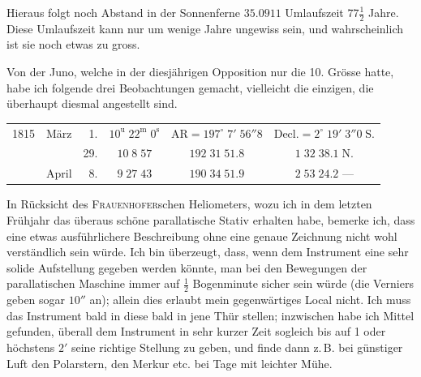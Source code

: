 \par\indent Hieraus folgt noch Abstand in der Sonnenferne $35.0911$ Umlaufszeit $77\tfrac12$ Jahre. Diese Umlaufszeit
kann nur um wenige Jahre ungewiss sein, und wahrscheinlich ist sie noch etwas zu gross.

\par\indent Von der Juno, welche in der diesjährigen Opposition nur die 10. Grösse hatte, habe ich folgende
drei Beobachtungen gemacht, vielleicht die einzigen, die überhaupt diesmal angestellt sind.

\begin{center}\fontsize{9}{11}\selectfont\setlength{\tabcolsep}{2pt}\renewcommand{\arraystretch}{1.15}\begin{tabular}{llrccc}
1815 & März & 1. & $10^{\mathrm u}\;22^{\mathrm m}\;0^{\mathrm s}$ & $\mathrm{AR}=197^\circ\;7'\;56''8$ & $\mathrm{Decl.}=2^\circ\;19'\;3''0\;\mathrm{S.}$\\
 & & 29. & $10\;8\;57$ & $192\;31\;51.8$ & $1\;32\;38.1\;\mathrm{N.}$\\
 & April & 8. & $9\;27\;43$ & $190\;34\;51.9$ & $2\;53\;24.2$ ---\\
\end{tabular}\end{center}

\par\indent In Rücksicht des \textsc{Frauenhofer}schen Heliometers, wozu ich in dem letzten Frühjahr das überaus
schöne parallatische Stativ erhalten habe, bemerke ich, dass eine etwas ausführlichere Beschreibung
ohne eine genaue Zeichnung nicht wohl verständlich sein würde. Ich bin überzeugt, dass, wenn dem
Instrument eine sehr solide Aufstellung gegeben werden könnte, man bei den Bewegungen der parallatischen Maschine immer auf $\tfrac12$ Bogenminute sicher sein würde (die Verniers geben sogar $10''$ an); allein
dies erlaubt mein gegenwärtiges Local nicht. Ich muss das Instrument bald in diese bald in jene Thür
stellen; inzwischen habe ich Mittel gefunden, überall dem Instrument in sehr kurzer Zeit sogleich bis
auf 1 oder höchstens $2'$ seine richtige Stellung zu geben, und finde dann z.\,B. bei günstiger Luft den
Polarstern, den Merkur etc. bei Tage mit leichter Mühe.
